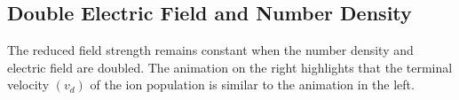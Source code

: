 \documentclass[10pt,a4paper,final]{article}
\begin{document}
\subsection{Double Electric Field and Number Density}
The reduced field strength remains constant when the number density and electric field are doubled. The animation on the right highlights that the terminal velocity $(v_d)$ of the ion population is similar to the animation in the left.
	
	
	
	
\end{document}
